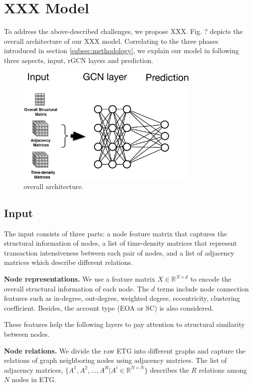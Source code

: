 
\section{XXX Model}
To address the above-described challenges, we propose XXX. Fig. ? depicts the overall architecture of our XXX model. Correlating to the three phases introduced in section \ref{subsec:methodology}, we explain our model in following three aspects, input, rGCN layers and prediction.

\begin{figure}[htbp]
	\centering
	\label{architecture}
	\includegraphics[width=3.5in]{fig/architecture.eps}
	\caption{overall architecture.}
\end{figure}


\subsection{Input}
\label{sec:input}
 The input consists of three parts: a node feature matrix that captures the structural information of nodes, a list of time-density matrices that represent transaction intensiveness between each pair of nodes, and a list of adjacency matrices which describe different relations.

\textbf{Node representations.} We use a feature matrix $X \in \mathbb{R}^{N \times d}$ to encode the overall structural information of each node. The $d$ terms include node connection features such as in-degree, out-degree, weighted degree, eccentricity, clustering coefficient. Besides, the account type (EOA or SC) is also considered.   

These features help the following layers to pay attention to structural similarity between nodes.

\textbf{Node relations.} We divide the raw ETG into different graphs and capture the relations of graph neighboring nodes using adjacency matrices. The list of adjacency matrices, $\{A^1,A^2,...,A^R|A^i\in \mathbb{R}^{N \times N}\}$ describes the $R$ relations among $N$ nodes in ETG.

